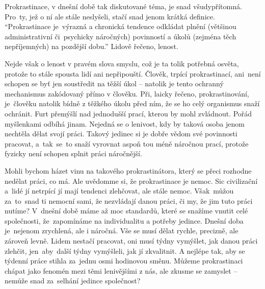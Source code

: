 \documentclass[12pt]{article}
\begin{document}
Prokrastinace, v dnešní době tak diskutované téma, je snad všudypřítomná.
Pro~ty, jež o ní ale stále neslyšeli, stačí snad jenom krátká definice.
\enquote{Prokrastinace je~výrazná a chronická tendence odkládat plnění (většinou administrativní či~psychicky náročných) povinností a úkolů (zejména těch nepříjemných) na pozdější dobu.}
Lidově řečeno, lenost.

Nejde však o lenost v pravém slova smyslu, což je ta tolik potřebná osvěta, protože to stále spousta lidí ani nepřipouští.
Člověk, trpící prokrastinací, ani~není schopen se byť jen soustředit na těžší úkol -- natolik je tento ochranný mechanismus zakódovaný přímo v člověku.
Při, laicky řečeno, prokrastinování, je~člověku natolik bídně z těžkého úkolu před ním, že se ho celý organismus snaží ochránit.
Furt přemýšlí nad jednodušší prací, kterou by mohl zvládnout.
Pořád myšlenkami odbíhá jinam.
Nejedná se o lenivost, kdy by taková osoba jenom nechtěla dělat svojí práci.
Takový jedinec si je dobře vědom své povinnosti pracovat, a~tak~se~to snaží vyrovnat aspoň tou méně náročnou prací, protože fyzicky není schopen splnit práci náročnější.

Mohli bychom házet vinu na takového prokrastinátora, který se přeci rozhodne nedělat práci, co má.
Ale uvědomme si, že prokrastinace je nemoc.
Sic civilizační a~lidé jí netrpící jí mají tendenci zlehčovat, ale stále nemoc.
Však~můžou za~to~snad ti nemocní sami, že nezvládají danou práci, či my, že jim tuto práci nutíme?
V~dnešní době máme až moc standardů, které se snažíme vnutit celé společnosti, že~zapomínáme na individualitu a potřeby jedince.
Dnešní doba je~nejenom zrychlená, ale i náročná.
Vše se musí dělat rychle, precizně, ale zároveň levně.
Lidem nestačí pracovat, oni musí týdny vymýšlet, jak danou práci zlehčit, jen~aby~další týdny vymýšleli, jak jí zkvalitnit.
A nejlépe tak, aby se týdenní práce stihla za~jednu osmi hodinovou směnu.
Můžeme prokrastinaci chápat jako fenomén mezi těmi lenivějšími z nás, ale zkusme se zamyslet -- nemůže snad za~selhání jedince společnost?
\end{document}
